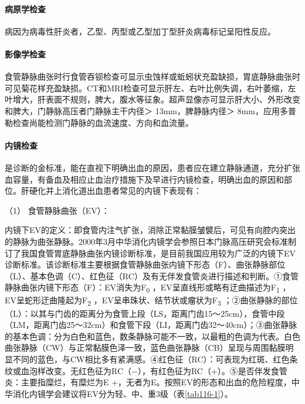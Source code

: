 \paragraph{病原学检查}

病因为病毒性肝炎者，乙型、丙型或乙型加丁型肝炎病毒标记呈阳性反应。

\paragraph{影像学检查}

食管静脉曲张时行食管吞钡检查可显示虫蚀样或蚯蚓状充盈缺损，胃底静脉曲张时可见菊花样充盈缺损。CT和MRI检查可显示肝左、右叶比例失调，右叶萎缩，左叶增大，肝表面不规则，脾大，腹水等征象。超声显像亦可显示肝大小、外形改变和脾大，门静脉高压者门静脉主干内径＞
13mm，脾静脉内径＞
8mm，应用多普勒检查尚能检测门静脉的血流速度、方向和血流量。

\paragraph{内镜检查}

是诊断的金标准，能在直视下明确出血的原因，患者应在建立静脉通道，充分扩张血容量，有备血及相应止血治疗措施下及早进行内镜检查，明确出血的原因和部位。肝硬化并上消化道出血患者常见的内镜下表现有：

\hypertarget{text00328.htmlux5cux23CHP11-7-1-2-2-5-1}{}
（1） 食管静脉曲张（EV）：

内镜下EV的定义：即食管内注气扩张，消除正常黏膜皱襞后，可见有向腔内突出的静脉为曲张静脉。2000年3月中华消化内镜学会参照日本门脉高压研究会标准制订了我国食管胃底静脉曲张内镜诊断标准，是目前我国应用较为广泛的内镜下EV诊断标准。该诊断标准主要根据食管静脉曲张内镜下形态（F）、曲张静脉部位（L）、基本色调（C）、红色征（RC）及有无伴发食管炎进行描述和判断。①食管静脉曲张内镜下形态（F）：EV消失为F\textsubscript{0}
，EV呈直线形或略有迂曲描述为F\textsubscript{1}
，EV呈蛇形迂曲隆起为F\textsubscript{2}
，EV呈串珠状、结节状或瘤状为F\textsubscript{3}
；②曲张静脉的部位（L）：以其与门齿的距离分为食管上段（LS，距离门齿15～25cm），食管中段（LM，距离门齿25～32cm）和食管下段（LI，距离门齿32～40cm）；③曲张静脉的基本色调：分为白色和蓝色，数条静脉可能不一致，以最粗的色调为代表。白色曲张静脉（CW）与正常黏膜色泽一致，蓝色曲张静脉（CB）呈现与周围黏膜明显不同的蓝色，与CW相比多有紧满感。④红色征（RC）：可表现为红斑、红色条纹或血泡样改变。无红色征为RC（−），有红色征为RC（+）。⑤是否伴发食管炎：主要指糜烂，有糜烂为E
+，无者为E。按照EV的形态和出血的危险程度，中华消化内镜学会建议将EV分为轻、中、重3级（表\ref{tab116-1}）。

